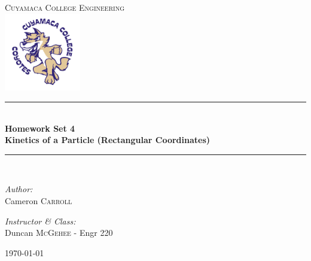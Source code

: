 \documentclass[11pt,letterpaper]{report}
\newcommand{\HRule}{\rule{\linewidth}{0.5mm}}
\begin{document}
\begin{titlepage}
\begin{center}

\textsc{\Large Cuyamaca College Engineering}\\[0.5cm]
\includegraphics[width=0.25\textwidth]{./clogo.jpg}

\HRule \\[0.4cm]
{ \LARGE \bfseries Homework Set 4}\\[0.5cm]
{ \large \bfseries Kinetics of a Particle (Rectangular Coordinates)}\\[0.5cm]

\HRule \\[1.5cm]

\begin{minipage}{0.4\textwidth}
\begin{flushleft} \large
\emph{Author:}\\
Cameron \textsc{Carroll}\\[0.2cm]

\end{flushleft}
\end{minipage}
\begin{minipage}{0.4\textwidth}
\begin{flushright} \large
\emph{Instructor \& Class:}\\
Duncan \textsc{McGehee} - Engr 220
\end{flushright}
\end{minipage}

\vfill

{\large \today}

\end{center}
\end{titlepage}
\end{document}
